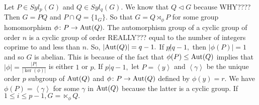 Let $P \in Syl_p(G)$ and $Q \in Syl_q(G).$ We know that $Q \triangleleft G$ because WHY????
Then $G = PQ$ and $ P \cap Q = \{ 1_G \}.$ So that $G = Q \rtimes_\phi P$ for some 
group homomorphism $ \phi \colon P \to \operatorname{Aut}(Q).$ The automorphism group of a cyclic group
of order $n$ is a cyclic group of order REALLY??? equal to the number of integers coprime 
to and less than $n.$ So, $ \lvert \operatorname{Aut}(Q) \rvert = q-1.$ If $ p\not | q-1,$ then $
\lvert \phi(P) \rvert = 1$ and so $G$ is abelian. This is because of
the fact that $\phi(P) \leq \operatorname{Aut}(Q)$ implies that $ \lvert \phi \rvert = \frac{ \lvert P
\rvert}{ \lvert \ker(\phi) \rvert}$ is either $1$ or $p.$
If $p | q-1,$ let $P = \left<y \right>$ and $\left< \gamma \right>$ be the unique order $p$
subgroup of $\operatorname{Aut}(Q)$ and $ \phi \colon P \to \operatorname{Aut}(Q)$ defined by $\phi(y) = r.$
We have $\phi(P) = \left< \gamma \right>$ for some $ \gamma$ in $\operatorname{Aut}(Q)$ because the
latter is a cyclic group. If $1 \leq i \leq p-1, G = \ltimes_ \phi Q.$


